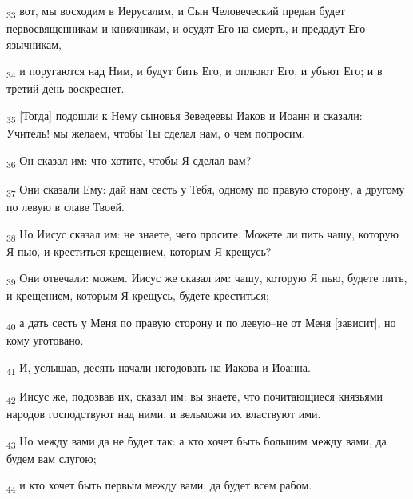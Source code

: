 \begin{tcolorbox}
\textsubscript{33} вот, мы восходим в Иерусалим, и Сын Человеческий предан будет первосвященникам и книжникам, и осудят Его на смерть, и предадут Его язычникам,
\end{tcolorbox}
\begin{tcolorbox}
\textsubscript{34} и поругаются над Ним, и будут бить Его, и оплюют Его, и убьют Его; и в третий день воскреснет.
\end{tcolorbox}
\begin{tcolorbox}
\textsubscript{35} [Тогда] подошли к Нему сыновья Зеведеевы Иаков и Иоанн и сказали: Учитель! мы желаем, чтобы Ты сделал нам, о чем попросим.
\end{tcolorbox}
\begin{tcolorbox}
\textsubscript{36} Он сказал им: что хотите, чтобы Я сделал вам?
\end{tcolorbox}
\begin{tcolorbox}
\textsubscript{37} Они сказали Ему: дай нам сесть у Тебя, одному по правую сторону, а другому по левую в славе Твоей.
\end{tcolorbox}
\begin{tcolorbox}
\textsubscript{38} Но Иисус сказал им: не знаете, чего просите. Можете ли пить чашу, которую Я пью, и креститься крещением, которым Я крещусь?
\end{tcolorbox}
\begin{tcolorbox}
\textsubscript{39} Они отвечали: можем. Иисус же сказал им: чашу, которую Я пью, будете пить, и крещением, которым Я крещусь, будете креститься;
\end{tcolorbox}
\begin{tcolorbox}
\textsubscript{40} а дать сесть у Меня по правую сторону и по левую--не от Меня [зависит], но кому уготовано.
\end{tcolorbox}
\begin{tcolorbox}
\textsubscript{41} И, услышав, десять начали негодовать на Иакова и Иоанна.
\end{tcolorbox}
\begin{tcolorbox}
\textsubscript{42} Иисус же, подозвав их, сказал им: вы знаете, что почитающиеся князьями народов господствуют над ними, и вельможи их властвуют ими.
\end{tcolorbox}
\begin{tcolorbox}
\textsubscript{43} Но между вами да не будет так: а кто хочет быть большим между вами, да будем вам слугою;
\end{tcolorbox}
\begin{tcolorbox}
\textsubscript{44} и кто хочет быть первым между вами, да будет всем рабом.
\end{tcolorbox}
